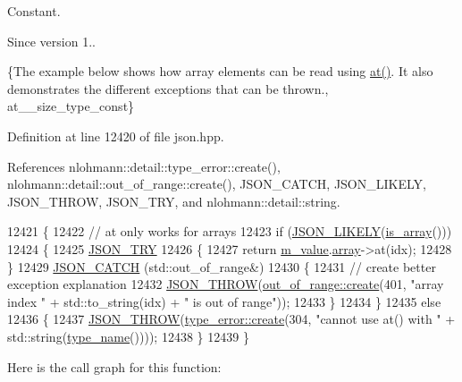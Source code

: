 Constant.

\begin{DoxySince}{Since}
version 1..
\end{DoxySince}
\{The example below shows how array elements can be read using {\ttfamily \hyperlink{classnlohmann_1_1basic__json_a73ae333487310e3302135189ce8ff5d8}{at()}}. It also demonstrates the different exceptions that can be thrown., at\+\_\+\+\_\+size\+\_\+type\+\_\+const\} 

Definition at line 12420 of file json.\+hpp.



References nlohmann\+::detail\+::type\+\_\+error\+::create(), nlohmann\+::detail\+::out\+\_\+of\+\_\+range\+::create(), J\+S\+O\+N\+\_\+\+C\+A\+T\+CH, J\+S\+O\+N\+\_\+\+L\+I\+K\+E\+LY, J\+S\+O\+N\+\_\+\+T\+H\+R\+OW, J\+S\+O\+N\+\_\+\+T\+RY, and nlohmann\+::detail\+::string.


\begin{DoxyCode}
12421     \{
12422         \textcolor{comment}{// at only works for arrays}
12423         \textcolor{keywordflow}{if} (\hyperlink{json_8hpp_a41ecd1c4cf7c3d56477b9b685b5daa72}{JSON\_LIKELY}(\hyperlink{classnlohmann_1_1basic__json_aef9ce5dd2381caee1f8ddcdb5bdd9c65}{is\_array}()))
12424         \{
12425             \hyperlink{json_8hpp_a985d3b82445302c57257f6432f261fe9}{JSON\_TRY}
12426             \{
12427                 \textcolor{keywordflow}{return} \hyperlink{classnlohmann_1_1basic__json_aeb0814f76966f99290cb29e127c90a77}{m\_value}.\hyperlink{unionnlohmann_1_1basic__json_1_1json__value_a7947687f3ae1911d6e9847e2b3226157}{array}->at(idx);
12428             \}
12429             \hyperlink{json_8hpp_a6954bec49ed2a2dfb938c1131c82740a}{JSON\_CATCH} (std::out\_of\_range&)
12430             \{
12431                 \textcolor{comment}{// create better exception explanation}
12432                 \hyperlink{json_8hpp_a6c274f6db2e65c1b66c7d41b06ad690f}{JSON\_THROW}(\hyperlink{classnlohmann_1_1detail_1_1out__of__range_a3f6d82a6f967c4728a1ec735a7867073}{out\_of\_range::create}(401, \textcolor{stringliteral}{"array index "} + 
      std::to\_string(idx) + \textcolor{stringliteral}{" is out of range"}));
12433             \}
12434         \}
12435         \textcolor{keywordflow}{else}
12436         \{
12437             \hyperlink{json_8hpp_a6c274f6db2e65c1b66c7d41b06ad690f}{JSON\_THROW}(\hyperlink{classnlohmann_1_1detail_1_1type__error_aecc083aea4b698c33d042670ba50c10f}{type\_error::create}(304, \textcolor{stringliteral}{"cannot use at() with "} + 
      std::string(\hyperlink{classnlohmann_1_1basic__json_a9d0a478571f82f0163b96b2424cd998f}{type\_name}())));
12438         \}
12439     \}
\end{DoxyCode}
Here is the call graph for this function\+:
\mbox{\label{classnlohmann_1_1basic__json_a93403e803947b86f4da2d1fb3345cf2c}} 
